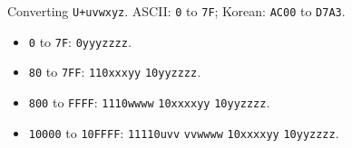 Converting \texttt{U+uvwxyz}. ASCII: \texttt{0} to \texttt{7F}; Korean: \texttt{AC00} to \texttt{D7A3}.
\begin{itemize}
	\item \texttt{0} to \texttt{7F}: \texttt{0yyyzzzz}.
	\item \texttt{80} to \texttt{7FF}: \texttt{110xxxyy} \texttt{10yyzzzz}.
	\item \texttt{800} to \texttt{FFFF}: \texttt{1110wwww} \texttt{10xxxxyy} \texttt{10yyzzzz}.
	\item \texttt{10000} to \texttt{10FFFF}: \texttt{11110uvv} \texttt{vvwwww} \texttt{10xxxxyy} \texttt{10yyzzzz}.
\end{itemize}